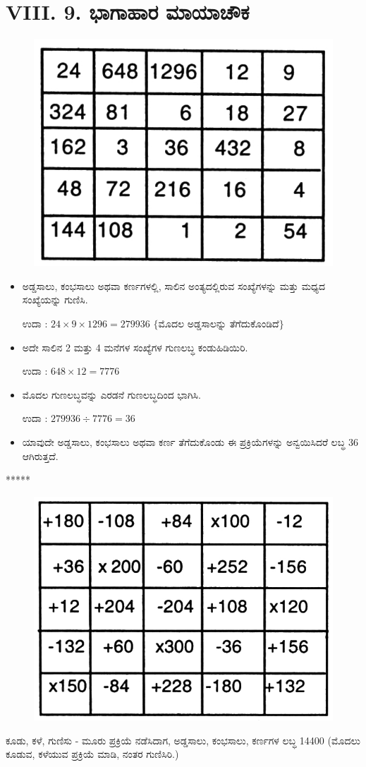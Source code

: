 \section*{VIII. 9. ಭಾಗಾಹಾರ ಮಾಯಾಚೌಕ}

\begin{figure}[H]
\includegraphics{src/figures/chap7/fig7.31.jpg}
\end{figure}
\begin{itemize}
	\item ಅಡ್ಡಸಾಲು, ಕಂಭಸಾಲು ಅಥವಾ ಕರ್ಣಗಳಲ್ಲಿ, ಸಾಲಿನ ಅಂತ್ಯದಲ್ಲಿರುವ ಸಂಖ್ಯೆಗಳನ್ನು ಮತ್ತು ಮಧ್ಯದ ಸಂಖ್ಯೆಯನ್ನು ಗುಣಿಸಿ.

	ಉದಾ : $24 \times 9 \times 1296=279936$ $\{$ಮೊದಲ ಅಡ್ಡಸಾಲನ್ನು ತೆಗೆದುಕೊಂಡಿದೆ$\}$ 
	\item ಅದೇ ಸಾಲಿನ 2 ಮತ್ತು 4 ಮನೆಗಳ ಸಂಖ್ಯೆಗಳ ಗುಣಲಬ್ಧ ಕಂಡುಹಿಡಿಯಿರಿ.

	ಉದಾ : $648 \times 12=7776$
	\item ಮೊದಲ ಗುಣಲಬ್ಧವನ್ನು ಎರಡನೆ ಗುಣಲಬ್ಧದಿಂದ ಭಾಗಿಸಿ.

	ಉದಾ : $279936 \div 7776 = \boxed{36}$
	\item ಯಾವುದೇ ಅಡ್ಡಸಾಲು, ಕಂಭಸಾಲು ಅಥವಾ ಕರ್ಣ ತೆಗೆದುಕೊಂಡು ಈ ಪ್ರಕ್ರಿಯೆಗಳನ್ನು ಅನ್ವಯಿಸಿದರೆ ಲಬ್ಧ 36 ಆಗಿರುತ್ತದೆ.
\end{itemize}
\begin{center}
*****
\end{center}
\begin{figure}[H]
\includegraphics{src/figures/chap7/fig7.32.jpg}
\end{figure}
ಕೂಡು, ಕಳೆ, ಗುಣಿಸು - ಮೂರು ಪ್ರಕ್ರಿಯೆ ನಡೆಸಿದಾಗ, ಅಡ್ಡಸಾಲು, ಕಂಭಸಾಲು, ಕರ್ಣಗಳ ಲಬ್ಧ 14400 (ಮೊದಲು ಕೂಡುವ, ಕಳೆಯುವ ಪ್ರಕ್ರಿಯೆ ಮಾಡಿ, ನಂತರ ಗುಣಿಸಿರಿ.)
